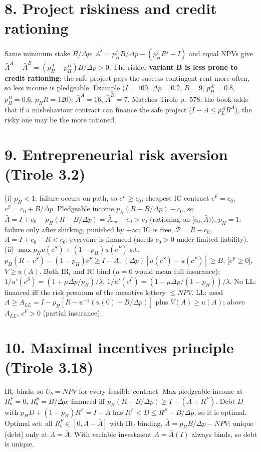 \documentclass[11pt,a4paper]{article}
\begin{document}
\section*{8. Project riskiness and credit rationing}
Same minimum stake $B/\Delta p$; $\bar A^j=p_H^jB/\Delta p-(p_H^jR^j-I)$ and equal NPVs give
$\bar A^A-\bar A^B=(p_H^A-p_H^B)B/\Delta p>0$. The riskier \textbf{variant B is less prone to
credit rationing}: the safe project pays the success-contingent rent more often, so less income is
pledgeable. Example ($I=100$, $\Delta p=0.2$, $B=9$, $p_H^A=0.8$, $p_H^B=0.6$, $p_HR=120$):
$\bar A^A=16$, $\bar A^B=7$. Matches Tirole p.~578; the book adds that if a misbehaviour contract
can finance the safe project ($I-A\le p_L^AR^A$), the risky one may be the more rationed.

\section*{9. Entrepreneurial risk aversion (Tirole 3.2)}
(i) $p_H<1$: failure occurs on path, so $c^F\ge c_0$; cheapest IC contract $c^F=c_0$, $c^S=c_0+B/\Delta p$.
Pledgeable income $p_H(R-B/\Delta p)-c_0$, so
$\bar A=I+c_0-p_H(R-B/\Delta p)=\bar A_{rn}+c_0>c_0$ (rationing on $[c_0,\bar A)$).
$p_H=1$: failure only after shirking, punished by $-\infty$; IC is free, $\mathcal P=R-c_0$,
$\bar A=I+c_0-R<c_0$: everyone is financed (needs $c_0>0$ under limited liability).\\
(ii) $\max p_Hu(c^S)+(1-p_H)u(c^F)$ s.t.\ $p_H(R-c^S)-(1-p_H)c^F\ge I-A$,
$(\Delta p)[u(c^S)-u(c^F)]\ge B$, [$c^F\ge0$], $V\ge u(A)$. Both IR$_l$ and IC bind ($\mu=0$ would mean
full insurance); $1/u'(c^S)=(1+\mu\Delta p/p_H)/\lambda$, $1/u'(c^F)=(1-\mu\Delta p/(1-p_H))/\lambda$.
No LL: financed iff the risk premium of the incentive lottery $\le\mathit{NPV}$. LL: need
$A\ge A_{LL}=I-p_H[R-u^{-1}(u(0)+B/\Delta p)]$ plus $V(A)\ge u(A)$; above $A_{LL}$, $c^F>0$ (partial insurance).

\section*{10. Maximal incentives principle (Tirole 3.18)}
IR$_l$ binds, so $U_b=\mathit{NPV}$ for every feasible contract. Max pledgeable income at
$R_b^F=0$, $R_b^S=B/\Delta p$: financed iff $p_H(R-B/\Delta p)\ge I-(A+R^F)$.
Debt $D$ with $p_HD+(1-p_H)R^F=I-A$ has $R^F<D\le R^S-B/\Delta p$, so it is optimal.
Optimal set: all $R_b^F\in[0,A-\bar A]$ with IR$_l$ binding, $\bar A=p_HB/\Delta p-\mathit{NPV}$:
unique (debt) only at $A=\bar A$. With variable investment $A=\bar A(I)$ always binds, so debt is unique.
\end{document}
